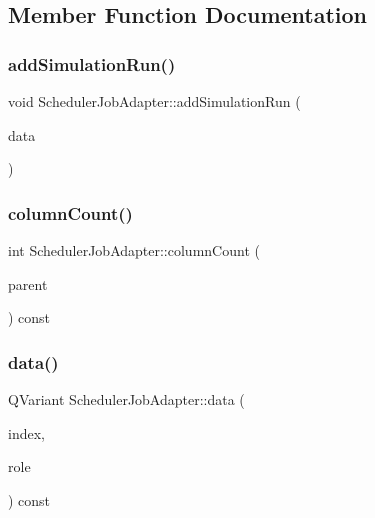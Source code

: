 \subsection{Member Function Documentation}
\mbox{\label{class_scheduler_job_adapter_a7bb95e3cb4df8be85706f3cd8f263b7b}} 
\subsubsection{\texorpdfstring{addSimulationRun()}{addSimulationRun()}}
{\footnotesize\ttfamily void Scheduler\+Job\+Adapter\+::add\+Simulation\+Run (\begin{DoxyParamCaption}\item[{const \mbox{\hyperlink{class_simulation_run}{Simulation\+Run}} \&}]{data }\end{DoxyParamCaption})}

\mbox{\label{class_scheduler_job_adapter_a641b222682c8a320db17a845aab76969}} 
\subsubsection{\texorpdfstring{columnCount()}{columnCount()}}
{\footnotesize\ttfamily int Scheduler\+Job\+Adapter\+::column\+Count (\begin{DoxyParamCaption}\item[{const Q\+Model\+Index \&}]{parent }\end{DoxyParamCaption}) const\hspace{0.3cm}{\ttfamily [override]}}

\mbox{\label{class_scheduler_job_adapter_aaaa7942a0fbbe22ab8400cc0d355e884}} 
\subsubsection{\texorpdfstring{data()}{data()}}
{\footnotesize\ttfamily Q\+Variant Scheduler\+Job\+Adapter\+::data (\begin{DoxyParamCaption}\item[{const Q\+Model\+Index \&}]{index,  }\item[{int}]{role }\end{DoxyParamCaption}) const\hspace{0.3cm}{\ttfamily [override]}}

